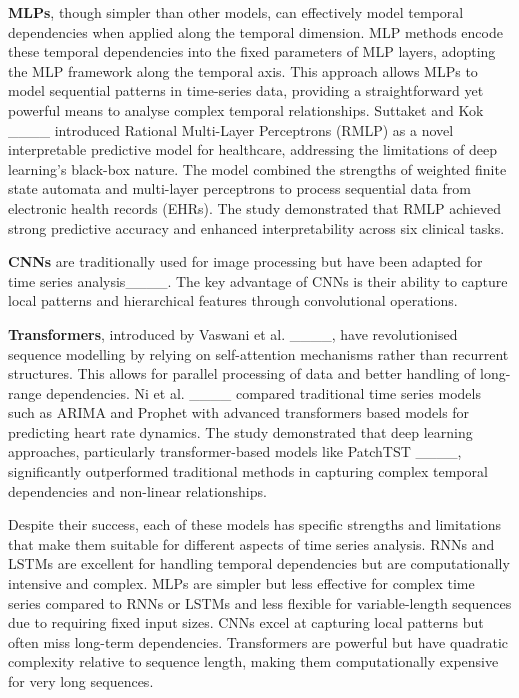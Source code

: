\textbf{MLPs}, though simpler than other models, can effectively model temporal dependencies when applied along the temporal dimension. MLP methods encode these temporal dependencies into the fixed parameters of MLP layers, adopting the MLP framework along the temporal axis. This approach allows MLPs to model sequential patterns in time-series data, providing a straightforward yet powerful means to analyse complex temporal relationships. Suttaket and Kok ____ introduced Rational Multi-Layer Perceptrons (RMLP) as a novel interpretable predictive model for healthcare, addressing the limitations of deep learning’s black-box nature. The model combined the strengths of weighted finite state automata and multi-layer perceptrons to process sequential data from electronic health records (EHRs). The study demonstrated that RMLP achieved strong predictive accuracy and enhanced interpretability across six clinical tasks. 

\textbf{CNNs} are traditionally used for image processing but have been adapted for time series analysis____. The key advantage of CNNs is their ability to capture local patterns and hierarchical features through convolutional operations.

\textbf{Transformers}, introduced by Vaswani et al. ____, have revolutionised sequence modelling by relying on self-attention mechanisms rather than recurrent structures. This allows for parallel processing of data and better handling of long-range dependencies. Ni et al. ____ compared traditional time series models such as ARIMA and Prophet with advanced transformers based models for predicting heart rate dynamics. The study demonstrated that deep learning approaches, particularly transformer-based models like PatchTST ____, significantly outperformed traditional methods in capturing complex temporal dependencies and non-linear relationships. 

Despite their success, each of these models has specific strengths and limitations that make them suitable for different aspects of time series analysis. RNNs and LSTMs are excellent for handling temporal dependencies but are computationally intensive and complex. MLPs are simpler but less effective for complex time series compared to RNNs or LSTMs and less flexible for variable-length sequences due to requiring fixed input sizes. CNNs excel at capturing local patterns but often miss long-term dependencies. Transformers are powerful but have quadratic complexity relative to sequence length, making them computationally expensive for very long sequences.

